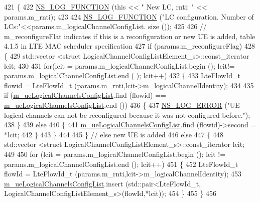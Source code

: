 \begin{DoxyCode}
421 \{
422   \hyperlink{log-macros-disabled_8h_a90b90d5bad1f39cb1b64923ea94c0761}{NS\_LOG\_FUNCTION} (\textcolor{keyword}{this} << \textcolor{stringliteral}{" New LC, rnti: "}  << params.m\_rnti);
423 
424   \hyperlink{log-macros-disabled_8h_a90b90d5bad1f39cb1b64923ea94c0761}{NS\_LOG\_FUNCTION} (\textcolor{stringliteral}{"LC configuration. Number of LCs:"}<<params.m\_logicalChannelConfigList.
      size ());
425 
426   \textcolor{comment}{// m\_reconfigureFlat indicates if this is a reconfiguration or new UE is added, table  4.1.5 in LTE MAC
       scheduler specification}
427   \textcolor{keywordflow}{if} (params.m\_reconfigureFlag)
428     \{
429       std::vector <struct LogicalChannelConfigListElement\_s>::const\_iterator lcit;
430 
431       \textcolor{keywordflow}{for}(lcit = params.m\_logicalChannelConfigList.begin (); lcit!= params.m\_logicalChannelConfigList.end (
      ); lcit++)
432         \{
433           LteFlowId\_t flowid = LteFlowId\_t (params.m\_rnti,lcit->m\_logicalChannelIdentity);
434 
435           \textcolor{keywordflow}{if} (\hyperlink{classns3_1_1CqaFfMacScheduler_a2e7fafcc959bf531979bc041782ac5b1}{m\_ueLogicalChannelsConfigList}.find (flowid) == 
      \hyperlink{classns3_1_1CqaFfMacScheduler_a2e7fafcc959bf531979bc041782ac5b1}{m\_ueLogicalChannelsConfigList}.end ())
436             \{
437               \hyperlink{group__logging_ga0261a8db1d4ac5f79417d117634fd455}{NS\_LOG\_ERROR} (\textcolor{stringliteral}{"UE logical channels can not be reconfigured because it was not
       configured before."});
438             \}
439           \textcolor{keywordflow}{else}
440             \{
441               \hyperlink{classns3_1_1CqaFfMacScheduler_a2e7fafcc959bf531979bc041782ac5b1}{m\_ueLogicalChannelsConfigList}.find (flowid)->second = *lcit;
442             \}
443         \}
444 
445     \}    \textcolor{comment}{// else new UE is added}
446   \textcolor{keywordflow}{else}
447     \{
448       std::vector <struct LogicalChannelConfigListElement\_s>::const\_iterator lcit;
449 
450       \textcolor{keywordflow}{for} (lcit = params.m\_logicalChannelConfigList.begin (); lcit != params.m\_logicalChannelConfigList.end
       (); lcit++)
451         \{
452           LteFlowId\_t flowId = LteFlowId\_t (params.m\_rnti,lcit->m\_logicalChannelIdentity);
453           \hyperlink{classns3_1_1CqaFfMacScheduler_a2e7fafcc959bf531979bc041782ac5b1}{m\_ueLogicalChannelsConfigList}.insert (std::pair<LteFlowId\_t,
       LogicalChannelConfigListElement\_s>(flowId,*lcit));
454         \}
455     \}
456 

\end{DoxyCode}
